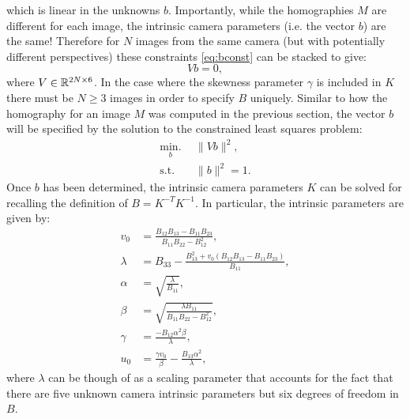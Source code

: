 which is linear in the unknowns $b$. Importantly, while the homographies $M$ are different for each image, the intrinsic camera parameters (i.e. the vector $b$) are the same! Therefore for $N$ images from the same camera (but with potentially different perspectives) these constraints \eqref{eq:bconst} can be stacked to give:
\begin{equation} \label{eq:allbconst}
    Vb = 0,
\end{equation}
where $V \in \mathbb{R}^{2N \times 6}$. In the case where the skewness parameter $\gamma$ is included in $K$ there must be $N \geq 3$ images in order to specify $B$ uniquely. Similar to how the homography for an image $M$ was computed in the previous section, the vector $b$ will be specified by the solution to the constrained least squares problem:
\begin{equation} \label{eq:bopt}
\begin{split}
\underset{b}{\text{min.}} \:\:& \lVert Vb \rVert^2, \\
    \text{s.t.}\:\:& \lVert b \rVert^2 = 1.
\end{split}
\end{equation}
Once $b$ has been determined, the intrinsic camera parameters $K$ can be solved for recalling the definition of $B = K^{-T}K^{-1}$. In particular, the intrinsic parameters are given by:
\begin{equation} \label{eq:B2K}
\begin{split}
    v_0 &= \frac{B_{12}B_{13} - B_{11}B_{23}}{B_{11}B_{22} - B_{12}^2}, \\
    \lambda &= B_{33} - \frac{B_{13}^2 + v_0(B_{12}B_{13} - B_{11}B_{23})}{B_{11}}, \\
    \alpha &= \sqrt{\frac{\lambda}{B_{11}}}, \\
    \beta &= \sqrt{\frac{\lambda B_{11}}{B_{11}B_{22} - B_{12}^2}}, \\
    \gamma &= \frac{-B_{12}\alpha^2\beta}{\lambda}, \\
    u_0 &= \frac{\gamma v_0}{\beta} - \frac{B_{13}\alpha^2}{\lambda},
\end{split}
\end{equation}
where $\lambda$ can be though of as a scaling parameter that accounts for the fact that there are five unknown camera intrinsic parameters but six degrees of freedom in $B$.

